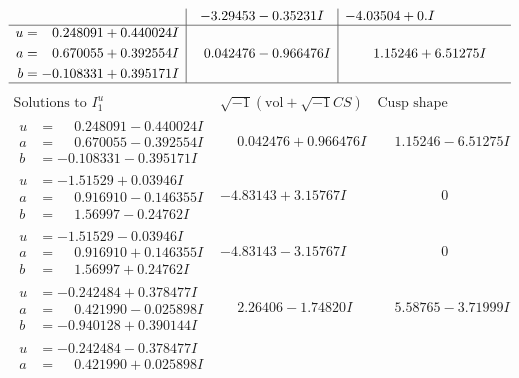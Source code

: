 \documentclass[1p]{elsarticle_modified}
\theoremstyle{definition}
\newcommand{\I}{\sqrt{-1}}
\begin{document}
$$\begin{array}{c|c|c}
 & -3.29453 - 0.35231 I & -4.03504 + 0. I\phantom{ +0.000000I} \\ \hline\begin{aligned}
u &= \phantom{-}0.248091 + 0.440024 I \\
a &= \phantom{-}0.670055 + 0.392554 I \\
b &= -0.108331 + 0.395171 I\end{aligned}
 & \phantom{-}0.042476 - 0.966476 I & \phantom{-}1.15246 + 6.51275 I\\
 \hline 
 \end{array}$$\newpage$$\begin{array}{c|c|c}  
\text{Solutions to }I^u_{1}& \I (\text{vol} + \sqrt{-1}CS) & \text{Cusp shape}\\
 \hline 
\begin{aligned}
u &= \phantom{-}0.248091 - 0.440024 I \\
a &= \phantom{-}0.670055 - 0.392554 I \\
b &= -0.108331 - 0.395171 I\end{aligned}
 & \phantom{-}0.042476 + 0.966476 I & \phantom{-}1.15246 - 6.51275 I \\ \hline\begin{aligned}
u &= -1.51529 + 0.03946 I \\
a &= \phantom{-}0.916910 - 0.146355 I \\
b &= \phantom{-}1.56997 - 0.24762 I\end{aligned}
 & -4.83143 + 3.15767 I & \phantom{-0.000000 } 0 \\ \hline\begin{aligned}
u &= -1.51529 - 0.03946 I \\
a &= \phantom{-}0.916910 + 0.146355 I \\
b &= \phantom{-}1.56997 + 0.24762 I\end{aligned}
 & -4.83143 - 3.15767 I & \phantom{-0.000000 } 0 \\ \hline\begin{aligned}
u &= -0.242484 + 0.378477 I \\
a &= \phantom{-}0.421990 - 0.025898 I \\
b &= -0.940128 + 0.390144 I\end{aligned}
 & \phantom{-}2.26406 - 1.74820 I & \phantom{-}5.58765 - 3.71999 I \\ \hline\begin{aligned}
u &= -0.242484 - 0.378477 I \\
a &= \phantom{-}0.421990 + 0.025898 I \\

\end{aligned}
\end{array}$$
\end{document}
